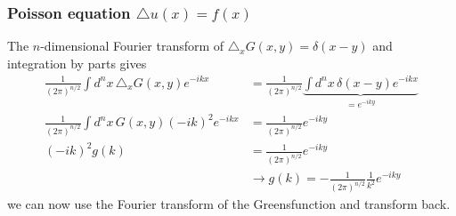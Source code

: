 \documentclass[10pt,a4paper]{article}
\theoremstyle{definition}
\begin{document}
\subsubsection{Poisson equation \texorpdfstring{$\triangle u(x) = f(x)$}{TEXT}}
        
    The $n$-dimensional Fourier transform of $\triangle_x G(x,y) = \delta(x-y)$ and integration by parts gives
    \begin{align}
        \frac{1}{(2\pi)^{n/2}}\int d^nx\,\triangle_x G(x,y) e^{-ikx}&=\frac{1}{(2\pi)^{n/2}}\underbrace{\int d^nx\,\delta(x-y) e^{-ikx}}_{=e^{-iky}}\\
        \frac{1}{(2\pi)^{n/2}}\int d^nx\, G(x,y) (-ik)^2 e^{-ikx}&=\frac{1}{(2\pi)^{n/2}}e^{-iky}\\
        (-ik)^2g(k)&=\frac{1}{(2\pi)^{n/2}}e^{-iky}\\
        &\rightarrow g(k)=-\frac{1}{(2\pi)^{n/2}}\frac{1}{k^2}e^{-iky}
    \end{align}
    we can now use the Fourier transform of the Greensfunction and transform back.
\end{document}
